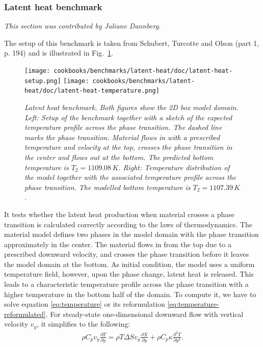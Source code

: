\documentclass{article}
\begin{document}
\subsubsection{Latent heat benchmark}
\label{sec:benchmark-latent_heat}

\textit{This section was contributed by Juliane Dannberg.}

The setup of this benchmark is taken from Schubert, Turcotte and Olson \cite{STO01} (part 1, p. 194) and is illustrated in Fig.~\ref{fig:latent-heat-benchmark}.
\begin{figure}
  \begin{center}
    \texttt{[image: cookbooks/benchmarks/latent-heat/doc/latent-heat-setup.png]}
    \hfill
    \texttt{[image: cookbooks/benchmarks/latent-heat/doc/latent-heat-temperature.png]}
  \end{center}
  \caption{\it Latent heat benchmark. Both figures show the 2D box model domain.
      Left: Setup of the benchmark together with a sketch of the expected
      temperature profile across the phase transition. The dashed line marks
      the phase transition. Material flows in with a prescribed temperature and
      velocity at the top, crosses the phase transition in the center and flows
      out at the bottom. The predicted bottom temperature is $T_2 = 1109.08 \, \si{K}$.
      Right: Temperature distribution of the model together with the associated
      temperature profile across the phase transition. The modelled bottom
      temperature is $T_2 = 1107.39 \, \si{K}$.}
  \label{fig:latent-heat-benchmark}
\end{figure}
It tests whether the latent heat production when material crosses a phase
transition is calculated correctly according to the laws of thermodynamics. The material
model defines two phases in the model domain with the phase transition
approximately in the center. The material flows in from the top due to a
prescribed downward velocity, and crosses the phase transition before it leaves
the model domain at the bottom. As initial condition, the model uses a uniform
temperature field, however, upon the phase change, latent heat is released. This
leads to a characteristic temperature profile across the phase transition with a
higher temperature in the bottom half of the domain. To compute it, we have to solve
equation \eqref{eq:temperature} or its reformulation
\eqref{eq:temperature-reformulated}. For
steady-state one-dimensional downward flow with vertical velocity $v_y$, it
simplifies to the following:
\begin{gather*}
\rho C_p
v_y
\frac{\partial T}{\partial y} =
\rho T \Delta S v_y \frac{\partial X}{\partial y}
+ \rho C_p \kappa
\frac{\partial^2 T}{\partial y^2}.
\end{gather*}
\end{document}
